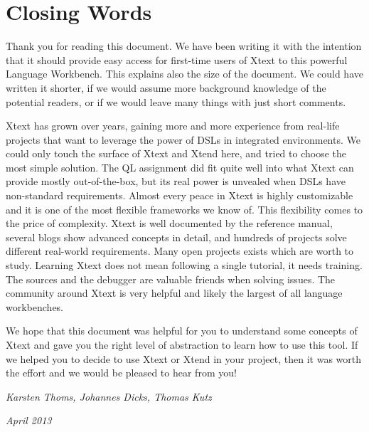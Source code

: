 \section{Closing Words}

Thank you for reading this document. We have been writing it with the intention
that it should provide easy access for first-time users of Xtext to this
powerful Language Workbench. This explains also the size of the document. We
could have written it shorter, if we would assume more background knowledge of
the potential readers, or if we would leave many things with just short
comments.

Xtext has grown over years, gaining more and more
experience from real-life projects that want to leverage the power of DSLs in
integrated environments. We could only touch the surface of Xtext and Xtend
here, and tried to choose the most simple solution. The QL assignment did fit
quite well into what Xtext can provide mostly out-of-the-box, but its real power
is unvealed when DSLs have non-standard requirements. Almost every peace in
Xtext is highly customizable and it is one of the most flexible frameworks we
know of. This flexibility comes to the price of complexity. Xtext is well
documented by the reference manual, several blogs show advanced concepts in
detail, and hundreds of projects solve different real-world requirements. Many
open projects exists which are worth to study. Learning Xtext does not mean
following a single tutorial, it needs training. The sources and the debugger are
valuable friends when solving issues. The community around Xtext is very helpful
and likely the largest of all language workbenches.

We hope that this document was helpful for you to understand some concepts of
Xtext and gave you the right level of abstraction to learn how to use this tool.
If we helped you to decide to use Xtext or Xtend in your project, then it was
worth the effort and we would be pleased to hear from you! 

\par
\par
\par

\emph{\large{Karsten Thoms, Johannes Dicks, Thomas Kutz}}

\emph{April 2013}

